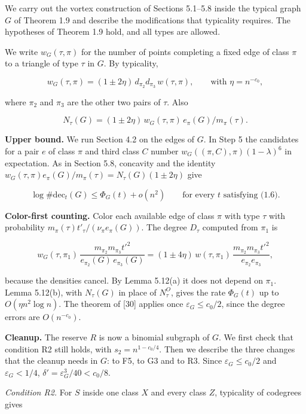 \documentclass[english,11pt,a4paper]{article}
\begin{document}
We carry out the vortex construction of Sections 5.1--5.8 inside the typical graph \(G\) of Theorem 1.9 and describe the modifications that typicality requires. The hypotheses of Theorem 1.9 hold, and all types are allowed.

We write \(w_G(\tau,\pi)\) for the number of points completing a fixed edge of class \(\pi\) to a triangle of type \(\tau\) in \(G\). By typicality,

\nopagebreak[4]
\[w_G(\tau,\pi)=(1\pm2\eta)\,d_{\pi_2}d_{\pi_3}\,w(\tau,\pi),\qquad\text{with }\eta=n^{-c_0},\]

where \(\pi_2\) and \(\pi_3\) are the other two pairs of \(\tau\). Also

\nopagebreak[4]
\[N_\tau(G)=(1\pm2\eta)\,w_G(\tau,\pi)\,e_\pi(G)/m_\pi(\tau).\]

\textbf{Upper bound.} We run Section 4.2 on the edges of \(G\). In Step 5 the candidates for a pair \(e\) of class \(\pi\) and third class \(C\) number \(w_G((\pi,C),\pi)(1-\lambda)^6\) in expectation. As in Section 5.8, concavity and the identity \(w_G(\tau,\pi)e_\pi(G)/m_\pi(\tau)=N_\tau(G)(1\pm2\eta)\) give

\nopagebreak[4]
\[\log\#\mathrm{dec}_t(G)\le\Phi_G(t)+o(n^2)\qquad\text{for every $t$ satisfying (1.6).}\tag{5.4}\]

\textbf{Color-first counting.} Color each available edge of class \(\pi\) with type \(\tau\) with probability \(m_\pi(\tau)t'_\tau/(\nu_\pi e_\pi(G))\). The degree \(D_\tau\) computed from \(\pi_1\) is

\nopagebreak[4]
\[w_G(\tau,\pi_1)\,\frac{m_{\pi_2}m_{\pi_3}t'^2}{e_{\pi_2}(G)\,e_{\pi_3}(G)}
=(1\pm4\eta)\,w(\tau,\pi_1)\,\frac{m_{\pi_2}m_{\pi_3}t'^2}{e_{\pi_2}e_{\pi_3}},\]

because the densities cancel. By Lemma 5.12(a) it does not depend on \(\pi_1\). Lemma 5.12(b), with \(N_\tau(G)\) in place of \(N^O_\tau\), gives the rate \(\Phi_G(t)\) up to \(O(\eta n^2\log n)\). The theorem of {[}30{]} applies once \(\varepsilon_G\le c_0/2\), since the degree errors are \(O(n^{-c_0})\).

\textbf{Cleanup.} The reserve \(R\) is now a binomial subgraph of \(G\). We first check that condition R2 still holds, with \(s_2=n^{1-c_0/4}\). Then we describe the three changes that the cleanup needs in \(G\): to F5, to G3 and to R3. Since \(\varepsilon_G\le c_0/2\) and \(\varepsilon_G<1/4\), \(\delta'=\varepsilon_G^3/40<c_0/8\).

\emph{Condition R2.} For \(S\) inside one class \(X\) and every class \(Z\), typicality of codegrees gives
\end{document}
